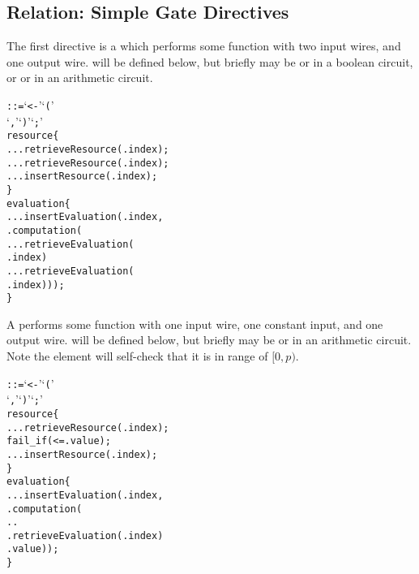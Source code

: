\subsection{Relation: Simple Gate Directives}\label{simple_gate_text}
The first directive is a  which performs some function with two input wires, and one output wire.
 will be defined below, but briefly may be  or  in a boolean circuit, or  or  in an arithmetic circuit.\\

\begin{alltt}\ttSyn
   ::=  `<-'  `('
                   `,'  `)' `;'\ttSem
  resource \{
    ...retrieveResource(.index);
    ...retrieveResource(.index);
    ...insertResource(.index);
  \}
  evaluation \{
    ...insertEvaluation(.index,
        .computation(
          ...retrieveEvaluation(
            .index)
          ...retrieveEvaluation(
            .index)));
  \}
\end{alltt}

A  performs some function with one input wire, one constant input, and one output wire.
 will be defined below, but briefly may be  or  in an arithmetic circuit.
Note the  element will self-check that it is in range of $[0, p)$.\\

\begin{alltt}\ttSyn
   ::=  `<-'  `('
                         `,'  `)' `;'\ttSem
  resource \{
    ...retrieveResource(.index);
    fail_if( <= .value);
    ...insertResource(.index);
  \}
  evaluation \{
    ...insertEvaluation(.index,
        .computation(
          ..
            .retrieveEvaluation(.index)
          .value));
  \}
\end{alltt}

